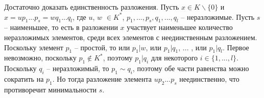 \Proof Достаточно доказать единственность разложения. \newline Пусть $x \in K\backslash \{0\}$ и $x = up_1 ... p_s = wq_1...q_l$, где $u$, $w$ $\in K^*$, $p_1,... , p_s, q_1, ... , q_l$ -- неразложимые.
\newline Пусть $s$ -- наименьшее, то есть в разложении $x$ участвует наименьшее количество неразложимых элементов, среди всех элементов с неединственным разложением. \newline Поскольку элемент $p_1$ -- простой, то или $p_1 | w$, или $p_1 | q_1$, ... , или $p_1 | q_l$. Первое невозможно, поскольку $p_1 \not\in K^*$, поэтому $p_1 | q_i$ для некоторого $i \in \{1, ..., l\}$. Поскольку $q_i$ -- неразложимый, то $p_1 \sim q_i$, поэтому обе части равенства можно сократить на $p_1$. Но тогда разложение элемента $up_2 ... p_s$
неединственно, что противоречит минимальности $s$. \EndProof